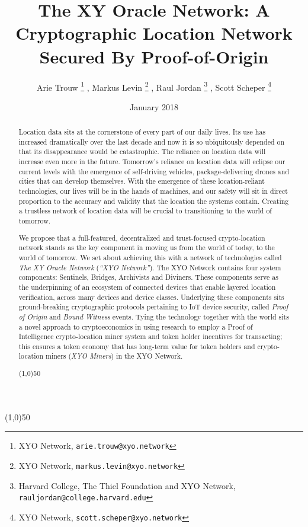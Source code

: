 \documentclass{article}
\title {The XY Oracle Network: A Cryptographic Location Network Secured By Proof-of-Origin}
\author{
	Arie Trouw
		\thanks{XYO Network, \texttt{arie.trouw@xyo.network}}
	, Markus Levin
		\thanks{XYO Network, \texttt{markus.levin@xyo.network}}
	, Raul Jordan
		\thanks{Harvard College, The Thiel Foundation and XYO Network, \texttt{rauljordan@college.harvard.edu}}
	, Scott Scheper
		\thanks{XYO Network, \texttt{scott.scheper@xyo.network}}
}
\date{January 2018}
\begin{document}
\maketitle

\begin{center}
\line(1,0){50}
\end{center}


\begin{abstract}
Location data sits at the cornerstone of every part of our daily lives. Its use has increased dramatically over the last decade and now it is so ubiquitously depended on that its disappearance would be catastrophic. The reliance on location data will increase even more in the future. Tomorrow's reliance on location data will eclipse our current levels with the emergence of self-driving vehicles, package-delivering drones and cities that can develop themselves. With the emergence of these location-reliant technologies, our lives will be in the hands of machines, and our safety will sit in direct proportion to the accuracy and validity that the location the systems contain. Creating a trustless network of location data will be crucial to transitioning to the world of tomorrow.

We propose that a full-featured, decentralized and trust-focused crypto-location network stands as the key component in moving us from the world of today, to the world of tomorrow. We set about achieving this with a network of technologies called \textit{The XY Oracle Network} (\textit{``XYO Network''}). The XYO Network contains four system components: Sentinels, Bridges, Archivists and Diviners. These components serve as the underpinning of an ecosystem of connected devices that enable layered location verification, across many devices and device classes. Underlying these components sits ground-breaking cryptographic protocols pertaining to IoT device security, called \textit{Proof of Origin} and \textit{Bound Witness} events. Tying the technology together with the world sits a novel approach to cryptoeconomics in using research to employ a Proof of Intelligence crypto-location miner system and token holder incentives for transacting; this ensures a token economy that has long-term value for token holders and crypto-location miners (\textit{XYO Miners}) in the XYO Network.
\begin{center}
\line(1,0){50}
\end{center}
\end{abstract}

\clearpage
\end{document}
